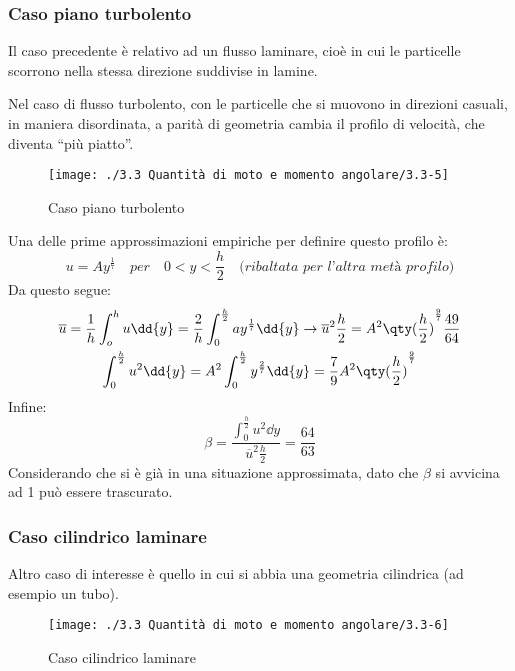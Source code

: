 \subsubsection{Caso piano turbolento}
Il caso precedente è relativo ad un flusso laminare, cioè in cui le particelle scorrono nella stessa direzione suddivise in lamine.

Nel caso di flusso turbolento, con le particelle che si muovono in direzioni casuali, in maniera disordinata, a parità di geometria cambia il profilo di velocità, che diventa ``più piatto''.
%
	\begin{figure}[ht]
		\texttt{[image: ./3.3 Quantità di moto e momento angolare/3.3-5]}
		\centering
		\caption{Caso piano turbolento}
	\end{figure}
%

Una delle prime approssimazioni empiriche per definire questo profilo è:
%
	\begin{equation*}
		u = A y^{\frac{1}{7}} \quad \textit{per} \quad 0 < y < \frac{h}{2} \quad \textit{(ribaltata per l'altra metà profilo)}
	\end{equation*}
%
Da questo segue:
%
	\begin{equation*}
		\begin{gathered}
			\overline{u} = \frac{1}{h} \int_o^h u \dd{y} = \frac{2}{h} \int_0^{\frac{h}{2}} a y^{\frac{1}{7}} \dd{y} \rightarrow \overline{u}^2 \frac{h}{2} = A^2 {\qty(\frac{h}{2})}^{\frac{9}{7}} \frac{49}{64} \\
			\int_0^{\frac{h}{2}} u^2 \dd{y} = A^2 \int_0^{\frac{h}{2}} y^{\frac{2}{7}} \dd{y} = \frac{7}{9} A^2 {\qty( \frac{h}{2})}^{\frac{9}{7}}
		\end{gathered}
	\end{equation*}
%			
Infine:			
%
	\begin{equation*}
			\beta = \frac{\int_0^{\frac{h}{2}} u^2 \dd{y}}{\overline{u}^2 \frac{h}{2}} = \frac{64}{63}
	\end{equation*}
%
Considerando che si è già in una situazione approssimata, dato che $\beta$ si avvicina ad 1 può essere trascurato.

\subsubsection{Caso cilindrico laminare}
Altro caso di interesse è quello in cui si abbia una geometria cilindrica (ad esempio un tubo).
%
	\begin{figure}[ht]
		\texttt{[image: ./3.3 Quantità di moto e momento angolare/3.3-6]}
		\centering
		\caption{Caso cilindrico laminare}
	\end{figure}
%

